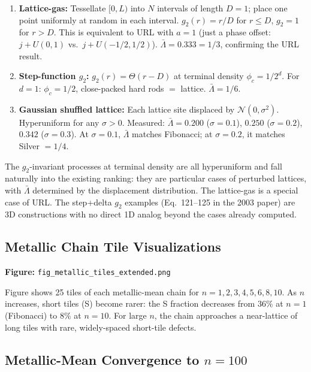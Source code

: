 \documentclass[11pt,letterpaper]{article}
\begin{document}
\begin{enumerate}[noitemsep]
  \item \textbf{Lattice-gas:} Tessellate $[0, L)$ into $N$ intervals of length $D = 1$;
        place one point uniformly at random in each interval.
        $g_2(r) = r/D$ for $r \leq D$, $g_2 = 1$ for $r > D$.
        This is equivalent to URL with $a = 1$ (just a phase offset:
        $j + U(0,1)$ vs.\ $j + U(-1/2, 1/2)$).
        \textbf{$\bar\Lambda = 0.333 = 1/3$}, confirming the URL result.

  \item \textbf{Step-function $g_2$:} $g_2(r) = \Theta(r - D)$ at terminal density
        $\phi_c = 1/2^d$. For $d = 1$: $\phi_c = 1/2$, close-packed hard rods $=$ lattice.
        \textbf{$\bar\Lambda = 1/6$}.

  \item \textbf{Gaussian shuffled lattice:} Each lattice site displaced by
        $\mathcal{N}(0, \sigma^2)$. Hyperuniform for any $\sigma > 0$.
        Measured: $\bar\Lambda = 0.200$ ($\sigma = 0.1$),
        $0.250$ ($\sigma = 0.2$), $0.342$ ($\sigma = 0.3$).
        At $\sigma = 0.1$, $\bar\Lambda$ matches Fibonacci;
        at $\sigma = 0.2$, it matches Silver $= 1/4$.
\end{enumerate}

\noindent The $g_2$-invariant processes at terminal density are all hyperuniform
and fall naturally into the existing ranking: they are particular cases of
perturbed lattices, with $\bar\Lambda$ determined by the displacement distribution.
The lattice-gas is a special case of URL. The step+delta $g_2$ examples
(Eq.~121--125 in the 2003 paper) are 3D constructions with no direct 1D analog
beyond the cases already computed.

\subsection{Metallic Chain Tile Visualizations}

\textbf{Figure:} \texttt{fig\_metallic\_tiles\_extended.png}

Figure shows 25 tiles of each metallic-mean chain for $n = 1, 2, 3, 4, 5, 6, 8, 10$.
As $n$ increases, short tiles (S) become rarer: the S fraction decreases from $36\%$
at $n = 1$ (Fibonacci) to $8\%$ at $n = 10$.
For large $n$, the chain approaches a near-lattice of long tiles with rare,
widely-spaced short-tile defects.

\subsection{Metallic-Mean Convergence to $n = 100$}
\end{document}
